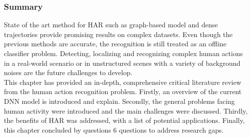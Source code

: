 \subsubsection{Summary}
\hspace{5mm} State of the art method for HAR such as graph-based model and dense trajectories provide promising results on complex datasets. Even though the previous methods are accurate, the recognition is still treated as an offline classifier problem. Detecting, localizing and recognizing complex human actions in a real-world scenario or in unstructured scenes with a variety of background noises are the future challenges to develop.\\

This chapter has provided an in-depth, comprehensive critical literature review from the human action recognition problem. Firstly, an overview of the current DNN model is introduced and explain. Secondly, the general problems facing human activity were introduced and the main challenges were discussed. Thirdly, the benefits of HAR was addressed, with a list of potential applications. Finally, this chapter concluded by questions 6 questions to address research gaps.


